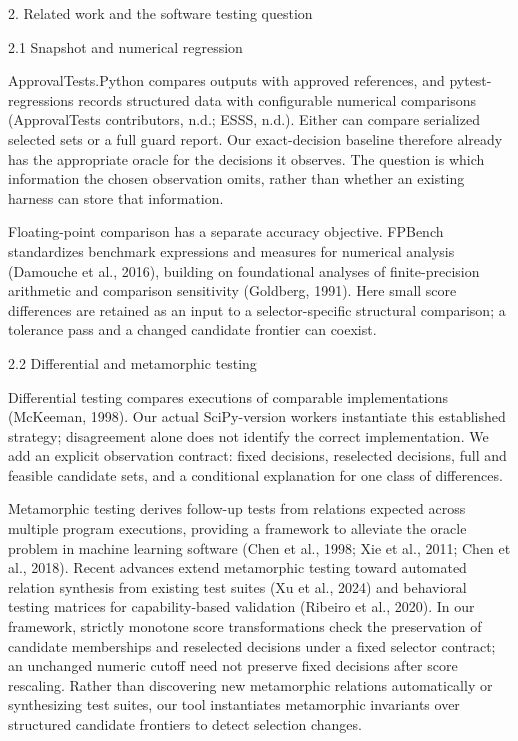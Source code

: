 \documentclass[11pt,a4paper]{article}
\begin{document}
2. Related work and the software testing question

2.1 Snapshot and numerical regression

ApprovalTests.Python compares outputs with approved references, and pytest-regressions records structured data with configurable numerical comparisons (ApprovalTests contributors, n.d.; ESSS, n.d.). Either can compare serialized selected sets or a full guard report. Our exact-decision baseline therefore already has the appropriate oracle for the decisions it observes. The question is which information the chosen observation omits, rather than whether an existing harness can store that information.

Floating-point comparison has a separate accuracy objective. FPBench standardizes benchmark expressions and measures for numerical analysis (Damouche et al., 2016), building on foundational analyses of finite-precision arithmetic and comparison sensitivity (Goldberg, 1991). Here small score differences are retained as an input to a selector-specific structural comparison; a tolerance pass and a changed candidate frontier can coexist.

2.2 Differential and metamorphic testing

Differential testing compares executions of comparable implementations (McKeeman, 1998). Our actual SciPy-version workers instantiate this established strategy; disagreement alone does not identify the correct implementation. We add an explicit observation contract: fixed decisions, reselected decisions, full and feasible candidate sets, and a conditional explanation for one class of differences.

Metamorphic testing derives follow-up tests from relations expected across multiple program executions, providing a framework to alleviate the oracle problem in machine learning software (Chen et al., 1998; Xie et al., 2011; Chen et al., 2018). Recent advances extend metamorphic testing toward automated relation synthesis from existing test suites (Xu et al., 2024) and behavioral testing matrices for capability-based validation (Ribeiro et al., 2020). In our framework, strictly monotone score transformations check the preservation of candidate memberships and reselected decisions under a fixed selector contract; an unchanged numeric cutoff need not preserve fixed decisions after score rescaling. Rather than discovering new metamorphic relations automatically or synthesizing test suites, our tool instantiates metamorphic invariants over structured candidate frontiers to detect selection changes.
\end{document}
